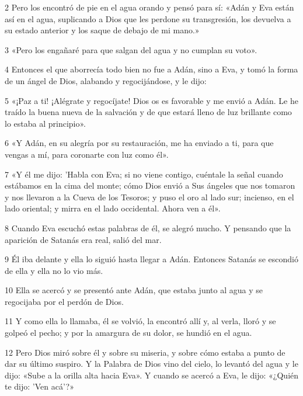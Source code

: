 \par 2 Pero los encontró de pie en el agua orando y pensó para sí: «Adán y Eva están así en el agua, suplicando a Dios que les perdone su transgresión, los devuelva a su estado anterior y los saque de debajo de mi mano.»

\par 3 «Pero los engañaré para que salgan del agua y no cumplan su voto».

\par 4 Entonces el que aborrecía todo bien no fue a Adán, sino a Eva, y tomó la forma de un ángel de Dios, alabando y regocijándose, y le dijo:

\par 5 «¡Paz a ti! ¡Alégrate y regocíjate! Dios os es favorable y me envió a Adán. Le he traído la buena nueva de la salvación y de que estará lleno de luz brillante como lo estaba al principio».

\par 6 «Y Adán, en su alegría por su restauración, me ha enviado a ti, para que vengas a mí, para coronarte con luz como él».

\par 7 «Y él me dijo: 'Habla con Eva; si no viene contigo, cuéntale la señal cuando estábamos en la cima del monte; cómo Dios envió a Sus ángeles que nos tomaron y nos llevaron a la Cueva de los Tesoros; y puso el oro al lado sur; incienso, en el lado oriental; y mirra en el lado occidental. Ahora ven a él».

\par 8 Cuando Eva escuchó estas palabras de él, se alegró mucho. Y pensando que la aparición de Satanás era real, salió del mar.

\par 9 Él iba delante y ella lo siguió hasta llegar a Adán. Entonces Satanás se escondió de ella y ella no lo vio más.

\par 10 Ella se acercó y se presentó ante Adán, que estaba junto al agua y se regocijaba por el perdón de Dios.

\par 11 Y como ella lo llamaba, él se volvió, la encontró allí y, al verla, lloró y se golpeó el pecho; y por la amargura de su dolor, se hundió en el agua.

\par 12 Pero Dios miró sobre él y sobre su miseria, y sobre cómo estaba a punto de dar su último suspiro. Y la Palabra de Dios vino del cielo, lo levantó del agua y le dijo: «Sube a la orilla alta hacia Eva». Y cuando se acercó a Eva, le dijo: «¿Quién te dijo: 'Ven acá'?»

